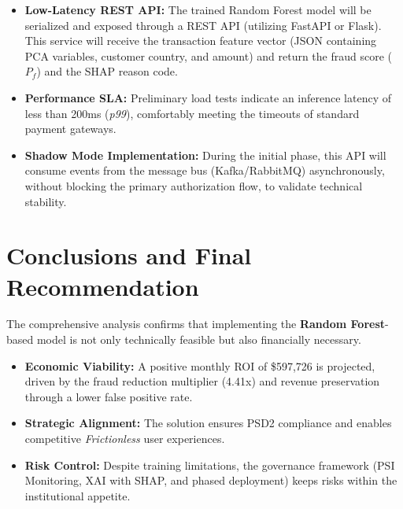 \documentclass[12pt,a4paper]{report}
\begin{document}
\begin{itemize}
    \item \textbf{Low-Latency REST API:} The trained Random Forest model will be serialized and exposed through a REST API (utilizing FastAPI or Flask). This service will receive the transaction feature vector (JSON containing PCA variables, customer country, and amount) and return the fraud score (\(P_f\)) and the SHAP reason code.
    
    \item \textbf{Performance SLA:} Preliminary load tests indicate an inference latency of less than 200ms (\textit{p99}), comfortably meeting the timeouts of standard payment gateways.
    
    \item \textbf{Shadow Mode Implementation:} During the initial phase, this API will consume events from the message bus (Kafka/RabbitMQ) asynchronously, without blocking the primary authorization flow, to validate technical stability.
\end{itemize}


\section{Conclusions and Final Recommendation}

The comprehensive analysis confirms that implementing the \textbf{Random Forest}-based model is not only technically feasible but also financially necessary.

\begin{itemize}
    \item \textbf{Economic Viability:} A positive monthly ROI of \$597,726 is projected, driven by the fraud reduction multiplier (4.41x) and revenue preservation through a lower false positive rate.
    \item \textbf{Strategic Alignment:} The solution ensures PSD2 compliance and enables competitive \textit{Frictionless} user experiences.
    \item \textbf{Risk Control:} Despite training limitations, the governance framework (PSI Monitoring, XAI with SHAP, and phased deployment) keeps risks within the institutional appetite.
\end{itemize}

\printbibliography
\end{document}
